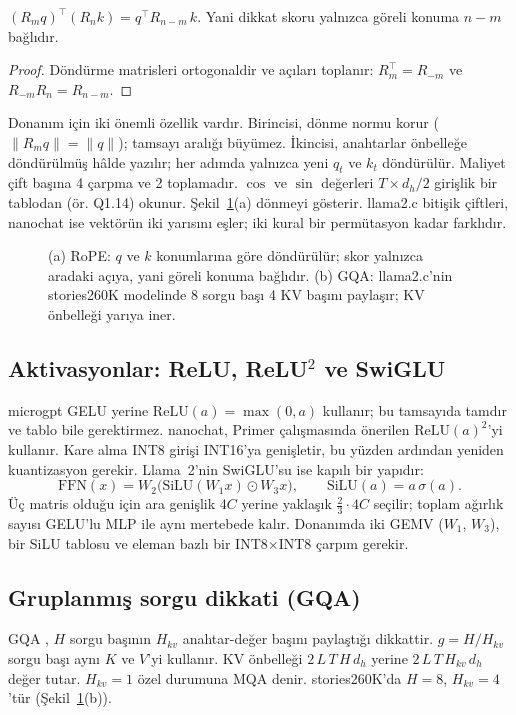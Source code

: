 \begin{onerme}\label{on:rope}
$(R_m q)^\top (R_n k) = q^\top R_{n-m}\, k$. Yani dikkat skoru yalnızca göreli konuma $n-m$ bağlıdır.
\end{onerme}
\begin{proof}
Döndürme matrisleri ortogonaldir ve açıları toplanır: $R_m^\top = R_{-m}$ ve $R_{-m} R_n = R_{n-m}$.
\end{proof}

\noindent Donanım için iki önemli özellik vardır. Birincisi, dönme normu korur ($\|R_m q\| = \|q\|$); tamsayı aralığı büyümez. İkincisi, anahtarlar önbelleğe döndürülmüş hâlde yazılır; her adımda yalnızca yeni $q_t$ ve $k_t$ döndürülür. Maliyet çift başına 4 çarpma ve 2 toplamadır. $\cos$ ve $\sin$ değerleri $T\times d_h/2$ girişlik bir tablodan (ör. Q1.14) okunur. Şekil~\ref{fig:rope}(a) dönmeyi gösterir. llama2.c bitişik çiftleri, nanochat ise vektörün iki yarısını eşler; iki kural bir permütasyon kadar farklıdır.

\begin{figure}[h]
  \centering
  \caption[RoPE ve GQA]{(a) RoPE: $q$ ve $k$ konumlarına göre döndürülür; skor yalnızca aradaki açıya, yani göreli konuma bağlıdır. (b) GQA: llama2.c'nin stories260K modelinde 8 sorgu başı 4 KV başını paylaşır; KV önbelleği yarıya iner.}
  \label{fig:rope}
\end{figure}

\subsection{Aktivasyonlar: ReLU, ReLU$^2$ ve SwiGLU}
microgpt GELU yerine $\mathrm{ReLU}(a) = \max(0,a)$ kullanır; bu tamsayıda tamdır ve tablo bile gerektirmez. nanochat, Primer çalışmasında \cite{primer} önerilen $\mathrm{ReLU}(a)^2$'yi kullanır. Kare alma INT8 girişi INT16'ya genişletir, bu yüzden ardından yeniden kuantizasyon gerekir. Llama~2'nin SwiGLU'su \cite{swiglu} ise kapılı bir yapıdır:
\begin{equation}
  \mathrm{FFN}(x) = W_2\big(\mathrm{SiLU}(W_1 x) \odot W_3 x\big), \qquad \mathrm{SiLU}(a) = a\,\sigma(a).
\end{equation}
Üç matris olduğu için ara genişlik $4C$ yerine yaklaşık $\tfrac{2}{3}\cdot 4C$ seçilir; toplam ağırlık sayısı GELU'lu MLP ile aynı mertebede kalır. Donanımda iki GEMV ($W_1$, $W_3$), bir SiLU tablosu ve eleman bazlı bir INT8$\times$INT8 çarpım gerekir.

\subsection{Gruplanmış sorgu dikkati (GQA)}
GQA \cite{gqa}, $H$ sorgu başının $H_{kv}$ anahtar-değer başını paylaştığı dikkattir. $g = H/H_{kv}$ sorgu başı aynı $K$ ve $V$'yi kullanır. KV önbelleği $2\,L\,T\,H\,d_h$ yerine $2\,L\,T\,H_{kv}\,d_h$ değer tutar. $H_{kv}=1$ özel durumuna MQA denir. stories260K'da $H=8$, $H_{kv}=4$'tür (Şekil~\ref{fig:rope}(b)).

